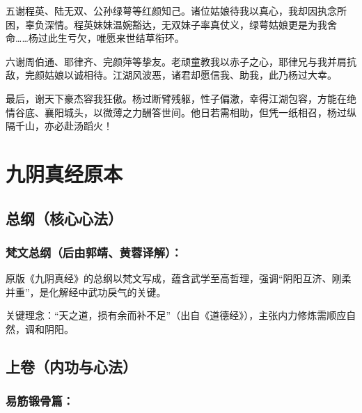 \documentclass[doctor, vlined, ]{DissertUESTC}
\begin{document}
	五谢程英、陆无双、公孙绿萼等红颜知己。诸位姑娘待我以真心，我却因执念所困，辜负深情。程英妹妹温婉豁达，无双妹子率真仗义，绿萼姑娘更是为我舍命……杨过此生亏欠，唯愿来世结草衔环。

	六谢周伯通、耶律齐、完颜萍等挚友。老顽童教我以赤子之心，耶律兄与我并肩抗敌，完颜姑娘以诚相待。江湖风波恶，诸君却愿信我、助我，此乃杨过大幸。

	最后，谢天下豪杰容我狂傲。杨过断臂残躯，性子偏激，幸得江湖包容，方能在绝情谷底、襄阳城头，以微薄之力酬答世间。他日若需相助，但凭一纸相召，杨过纵隔千山，亦必赴汤蹈火！

	
	
	
	\appendix
	
	\chapter{九阴真经原本}
	
	\section{总纲（核心心法）}
	
	\subsection{梵文总纲（后由郭靖、黄蓉译解）：}

	原版《九阴真经》的总纲以梵文写成，蕴含武学至高哲理，强调“阴阳互济、刚柔并重”，是化解经中武功戾气的关键。

	关键理念：“天之道，损有余而补不足”（出自《道德经》），主张内力修炼需顺应自然，调和阴阳。

	\section{上卷（内功与心法）}
	
	\subsection{易筋锻骨篇：}
\end{document}
